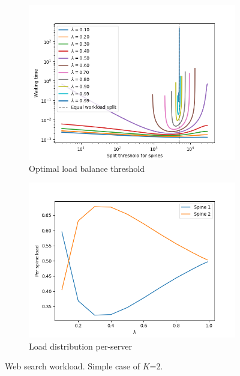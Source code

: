 \begin{figure}
	\centering
	\begin{subfigure}{.5\textwidth}
		\centering
		\includegraphics[width=.99\linewidth]{Chapter3/Figures/equal_workload_split_bpws}
		\caption{Optimal load balance threshold}
		\label{fig:cost-ws}
	\end{subfigure}%
	\begin{subfigure}{.5\textwidth}
		\centering
		\includegraphics[width=.99\linewidth]{Chapter3/Figures/per_spine_load_bpws}
		\caption{Load distribution per-server }
		\label{fig:perspineload-ws}
	\end{subfigure}
	\caption{Web search workload. Simple case of $K$=2.}
	\label{fig:lbthreshold-ws}
\end{figure}

